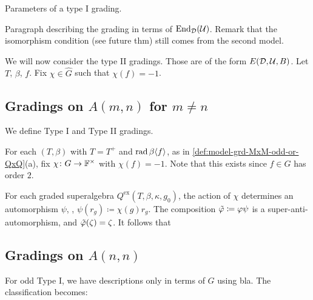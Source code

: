 \begin{defi}
    Parameters of a type I grading. 
\end{defi}

Paragraph describing the grading in terms of $\operatorname{End}_{\mathcal{D}} (\mathcal U)$. 
Remark that the isomorphism condition (see future thm) still comes from the second model.

We will now consider the type II gradings. 
Those are of the form $E(\mathcal{D}, \mathcal U, B)$. 
Let $T$, $\beta$, $f$. 
Fix $\chi\in \widehat G$ such that $\chi(f) = -1$. 




\subsection{Gradings on \texorpdfstring{$A(m,n)$}{A(m,n)} for \texorpdfstring{$m \neq n$}{m different than n}}



We define Type I and Type II gradings. 

For each $(T, \beta)$ with $T =T^+$ and $\operatorname{rad} \beta \langle f \rangle$, as in \cref{def:model-grd-MxM-odd-or-QxQ}(a), fix $\chi\colon G \to \mathbb{F}^\times$ with $\chi(f) = -1$. 
Note that this exists since $f\in G$ has order $2$. 

For each graded superalgebra $Q^{\mathrm{ex}}(T, \beta, \kappa, g_0)$, the action of $\chi$ determines an automorphism $\psi$, \ie, $\psi(r_g) \coloneqq \chi(g) r_g$. 
The composition $\tilde{\varphi} \coloneqq \varphi\psi$ is a super-anti-automorphism, and $\tilde{\varphi} (\zeta) = \zeta$. 
It follows that


\begin{thm}
    
\end{thm}

\subsection{Gradings on \texorpdfstring{$A(n,n)$}{A(n,n)}}

For odd Type I, we have descriptions only in terms of $G$ using bla. The classification becomes:

\begin{thm}
    
    
    
    
\end{thm}